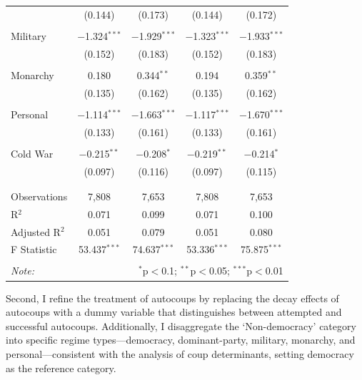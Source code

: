 \documentclass[
  12pt,
]{report}
\begin{document}
\begin{table}
{\begin{tabular}{@{\extracolsep{20pt}}lcccc}
  & (0.144) & (0.173) & (0.144) & (0.172) \\ 
  & & & & \\ 
 \hspace{1.5cm} Military & $-$1.324$^{***}$ & $-$1.929$^{***}$ & $-$1.323$^{***}$ & $-$1.933$^{***}$ \\ 
  & (0.152) & (0.183) & (0.152) & (0.183) \\ 
  & & & & \\ 
 \hspace{1.5cm} Monarchy & 0.180 & 0.344$^{**}$ & 0.194 & 0.359$^{**}$ \\ 
  & (0.135) & (0.162) & (0.135) & (0.162) \\ 
  & & & & \\ 
 \hspace{1.5cm} Personal & $-$1.114$^{***}$ & $-$1.663$^{***}$ & $-$1.117$^{***}$ & $-$1.670$^{***}$ \\ 
  & (0.133) & (0.161) & (0.133) & (0.161) \\ 
  & & & & \\ 
 Cold War & $-$0.215$^{**}$ & $-$0.208$^{*}$ & $-$0.219$^{**}$ & $-$0.214$^{*}$ \\ 
  & (0.097) & (0.116) & (0.097) & (0.115) \\ 
  & & & & \\ 
\hline \\[-1.8ex] 
Observations & 7,808 & 7,653 & 7,808 & 7,653 \\ 
R$^{2}$ & 0.071 & 0.099 & 0.071 & 0.100 \\ 
Adjusted R$^{2}$ & 0.051 & 0.079 & 0.051 & 0.080 \\ 
F Statistic & 53.437$^{***}$ & 74.637$^{***}$ & 53.336$^{***}$ & 75.875$^{***}$ \\ 
\hline 
\hline \\[-1.8ex] 
\textit{Note:}  & \multicolumn{4}{r}{$^{*}$p$<$0.1; $^{**}$p$<$0.05; $^{***}$p$<$0.01} \\ 
\end{tabular}

}

\end{table}%

Second, I refine the treatment of autocoups by replacing the decay
effects of autocoups with a dummy variable that distinguishes between
attempted and successful autocoups. Additionally, I disaggregate the
`Non-democracy' category into specific regime types---democracy,
dominant-party, military, monarchy, and personal---consistent with the
analysis of coup determinants, setting democracy as the reference
category.
\end{document}
